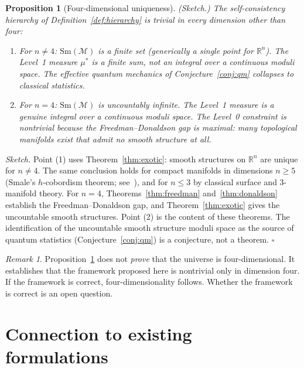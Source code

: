 \documentclass[12pt,a4paper]{article}
\newtheorem{proposition}{Proposition}
\theoremstyle{definition}
\theoremstyle{remark}
\newtheorem{remark}{Remark}
\begin{document}
\begin{proposition}[Four-dimensional uniqueness]
\emph{(Sketch.)}
\label{prop:4d}
The self-consistency hierarchy of Definition~\ref{def:hierarchy} is trivial in
every dimension other than four:
\begin{enumerate}
\item For $n \neq 4$: $\mathrm{Sm}(\mathcal{M})$ is a finite set (generically
a single point for $\mathbb{R}^n$). The Level~1 measure $\mu^*$ is a finite
sum, not an integral over a continuous moduli space. The effective quantum
mechanics of Conjecture~\ref{conj:qm} collapses to classical statistics.

\item For $n = 4$: $\mathrm{Sm}(\mathcal{M})$ is uncountably infinite.
The Level~1 measure is a genuine integral over a continuous moduli space.
The Level~0 constraint is nontrivial because the Freedman--Donaldson gap is
maximal: many topological manifolds exist that admit no smooth structure at all.
\end{enumerate}
\end{proposition}

\noindent\emph{Sketch.} Point (1) uses Theorem~\ref{thm:exotic}: smooth
structures on $\mathbb{R}^n$ are unique for $n \neq 4$. The same conclusion
holds for compact manifolds in dimensions $n \geq 5$ (Smale's $h$-cobordism
theorem; see~\cite{smale}), and for $n \leq 3$ by classical surface and
3-manifold theory. For $n = 4$, Theorems~\ref{thm:freedman}
and~\ref{thm:donaldson} establish the Freedman--Donaldson gap, and
Theorem~\ref{thm:exotic} gives the uncountable smooth structures.
Point (2) is the content of these theorems. The identification of the
uncountable smooth structure moduli space as the source of quantum statistics
(Conjecture~\ref{conj:qm}) is a conjecture, not a theorem. \hfill$\square$

\begin{remark}
Proposition~\ref{prop:4d} does not \emph{prove} that the universe is four-dimensional.
It establishes that the framework proposed here is nontrivial only in dimension
four. If the framework is correct, four-dimensionality follows. Whether the
framework is correct is an open question.
\end{remark}

\section{Connection to existing formulations}
\label{sec:connection}
\end{document}
